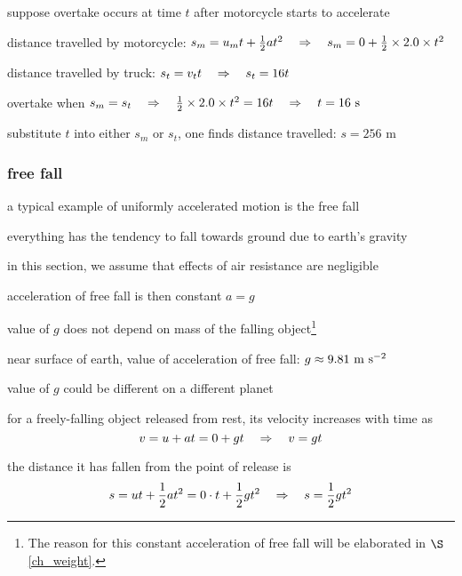 
\sol suppose overtake occurs at time $t$ after motorcycle starts to accelerate

distance travelled by motorcycle: $s_m = u_mt + \frac{1}{2}at^2  \quad \Rightarrow \quad s_m = 0 + \frac{1}{2}\times 2.0 \times t^2$

distance travelled by truck: $s_t = v_t t \quad \Rightarrow \quad s_t = 16t$

overtake when $s_m = s_t \quad \Rightarrow \quad \frac{1}{2}\times 2.0 \times t^2 = 16 t \quad \Rightarrow \quad t=16 \text{ s}$

substitute $t$ into either $s_m$ or $s_t$, one finds distance travelled: $s = 256 \text{ m}$ \eoe




\subsubsection{free fall}\label{ch_freefall}

a typical example of uniformly accelerated motion is the free fall

everything has the tendency to fall towards ground due to earth's gravity

in this section, we assume that effects of air resistance are negligible

acceleration of free fall is then constant $a=g$

value of $g$ does not depend on mass of the falling object\footnote{The reason for this constant acceleration of free fall will be elaborated in $\S$\ref{ch_weight}.}

\cmt near surface of earth, value of acceleration of free fall: $g\approx9.81\text{ m s$^{-2}$}$

value of $g$ could be different on a different planet

\cmt for a freely-falling object released from rest, its velocity increases with time as
\begin{equation*}
	v=u+at = 0 + gt \quad \Rightarrow \quad v = gt
\end{equation*}

the distance it has fallen from the point of release is
\begin{equation*}
s=ut+\frac{1}{2} at^2 = 0\cdot t + \frac{1}{2}gt^2 \quad \Rightarrow \quad s=\frac{1}{2}gt^2
\end{equation*}

